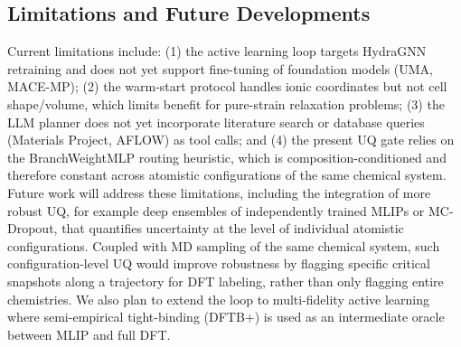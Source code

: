 \documentclass[conference]{IEEEtran}
\def\ac#1{#1}%
\def\acs#1{#1}%
\begin{document}
\begin{table}[t]
\centering
\caption{Locally hosted \acs{LLM} checkpoints available to the
\textsc{matsim-agents} agents. For mixture-of-experts (MoE) models, the value in
parentheses is the number of parameters activated per token; all other models
are dense, so every parameter is active.}
\label{tab:llms}
\end{table}

\subsection{Limitations and Future Developments}
Current limitations include: (1) the active learning loop targets HydraGNN
retraining and does not yet support fine-tuning of foundation models (UMA,
MACE-MP); (2) the warm-start protocol handles ionic coordinates but not cell
shape/volume, which limits benefit for pure-strain relaxation problems; (3) the
\acs{LLM} planner does not yet incorporate literature search or database queries
(Materials Project, AFLOW) as tool calls; and (4) the present \acs{UQ} gate relies
on the BranchWeightMLP routing heuristic, which is composition-conditioned and
therefore constant across atomistic configurations of the same chemical system.
Future work will address these limitations, including the integration of more
robust \acs{UQ}, for example deep ensembles of independently trained \acsp{MLIP}
or \ac{MC}-Dropout, that quantifies uncertainty at the level of individual
atomistic configurations. Coupled with \acs{MD} sampling of the same chemical
system, such configuration-level \acs{UQ} would improve robustness by flagging
specific critical snapshots along a trajectory for \acs{DFT} labeling, rather than
only flagging entire chemistries. We also plan to extend the loop to
multi-fidelity active learning where semi-empirical tight-binding (\ac{DFTB}+) is
used as an intermediate oracle between \acs{MLIP} and full \acs{DFT}.
\end{document}
